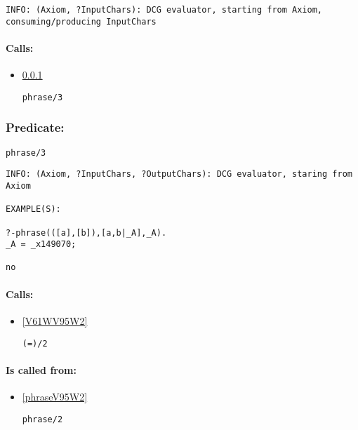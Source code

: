 {\small \begin{verbatim}
INFO: (Axiom, ?InputChars): DCG evaluator, starting from Axiom, consuming/producing InputChars

\end{verbatim}}
\paragraph{Calls:} 
\begin{itemize}
\item \ref{phraseV95W3} 
\begin{verbatim}
phrase/3
\end{verbatim}

\end{itemize}

\subsubsection{Predicate:} \label{phraseV95W3}

\begin{verbatim}
phrase/3
\end{verbatim}

{\small \begin{verbatim}
INFO: (Axiom, ?InputChars, ?OutputChars): DCG evaluator, staring from Axiom

EXAMPLE(S):

?-phrase(([a],[b]),[a,b|_A],_A).
_A = _x149070;

no

\end{verbatim}}
\paragraph{Calls:} 
\begin{itemize}
\item \ref{V61WV95W2} 
\begin{verbatim}
(=)/2
\end{verbatim}

\end{itemize}
\paragraph{Is called from:} 
\begin{itemize}
\item \ref{phraseV95W2} 
\begin{verbatim}
phrase/2
\end{verbatim}

\end{itemize}

